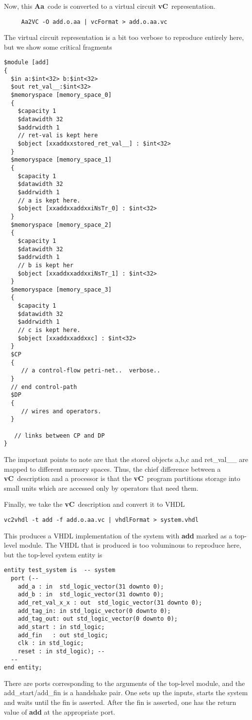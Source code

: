 \documentclass{article}
\newcommand{\Aa}{{\bf Aa}~}
\newcommand{\vC}{{\bf vC}~}
\begin{document}
Now, this \Aa code is converted to a virtual circuit \vC representation.
\begin{verbatim}
     Aa2VC -O add.o.aa | vcFormat > add.o.aa.vc
\end{verbatim}
The virtual circuit representation is a bit too verbose to reproduce entirely
here, but we show some critical fragments
\begin{verbatim}
$module [add] 
{
  $in a:$int<32> b:$int<32>
  $out ret_val__:$int<32>
  $memoryspace [memory_space_0] 
  {
    $capacity 1
    $datawidth 32
    $addrwidth 1
    // ret-val is kept here
    $object [xxaddxxstored_ret_val__] : $int<32>
  }
  $memoryspace [memory_space_1] 
  {
    $capacity 1
    $datawidth 32
    $addrwidth 1
    // a is kept here.
    $object [xxaddxxaddxxiNsTr_0] : $int<32>
  }
  $memoryspace [memory_space_2] 
  {
    $capacity 1
    $datawidth 32
    $addrwidth 1
    // b is kept her
    $object [xxaddxxaddxxiNsTr_1] : $int<32>
  }
  $memoryspace [memory_space_3] 
  {
    $capacity 1
    $datawidth 32
    $addrwidth 1
    // c is kept here.
    $object [xxaddxxaddxxc] : $int<32>
  }
  $CP 
  {
     // a control-flow petri-net..  verbose..
  }
  // end control-path
  $DP 
  {
     // wires and operators.
  }

   // links between CP and DP
}
\end{verbatim}
The important points to note are that the stored objects a,b,c and
ret\_val\_\_ are mapped to different memory spaces.  Thus, the
chief difference between a \vC description and a processor is 
that the \vC program partitions storage into small units which
are accessed only by operators that need them. 

Finally, we take the \vC description and convert it to
VHDL
\begin{verbatim}
vc2vhdl -t add -f add.o.aa.vc | vhdlFormat > system.vhdl
\end{verbatim}
This produces a VHDL implementation of the system with
{\bf add} marked as a top-level module.  The VHDL that
is produced is too voluminous to reproduce here, but
the top-level system entity is
\begin{verbatim}
entity test_system is  -- system
  port (--
    add_a : in  std_logic_vector(31 downto 0);
    add_b : in  std_logic_vector(31 downto 0);
    add_ret_val_x_x : out  std_logic_vector(31 downto 0);
    add_tag_in: in std_logic_vector(0 downto 0);
    add_tag_out: out std_logic_vector(0 downto 0);
    add_start : in std_logic;
    add_fin   : out std_logic;
    clk : in std_logic;
    reset : in std_logic); --
  --
end entity;
\end{verbatim}
There are ports corresponding to the arguments of the top-level module,
and the add\_start/add\_fin is a handshake pair.  One sets up the inputs,
starts the system and waits until the fin is asserted.  After the fin
is asserted, one has the return value of {\bf add} at the appropriate port.
\end{document}
